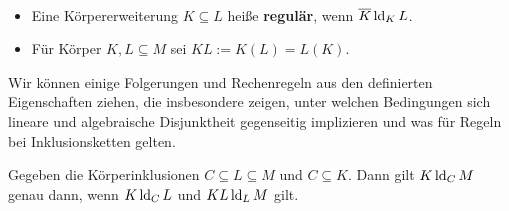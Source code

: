     \begin{definition}
    	\ 
    	\begin{itemize}
    		\item Eine Körpererweiterung $K\subseteq L$ heiße \textbf{regulär}, wenn $\overline{K}\operatorname{ld}_KL$.
    		\item Für Körper $K,L\subseteq M$ sei $KL:=K(L)=L(K)$.
    	\end{itemize}
    \end{definition}
    
    Wir können einige Folgerungen und \glqq{}Rechenregeln\grqq{} aus den definierten Eigenschaften ziehen, die insbesondere zeigen, unter welchen Bedingungen sich lineare und algebraische Disjunktheit gegenseitig implizieren und was für Regeln bei Inklusionsketten gelten.
    
    \begin{lemma}\label{Stapellemma}
    	Gegeben die Körperinklusionen $C\subseteq L\subseteq M$ und $C\subseteq K$. Dann gilt $K\operatorname{ld}_CM$ genau dann, wenn $K\operatorname{ld}_CL$ und $KL\operatorname{ld}_LM$ gilt.
    \end{lemma}
